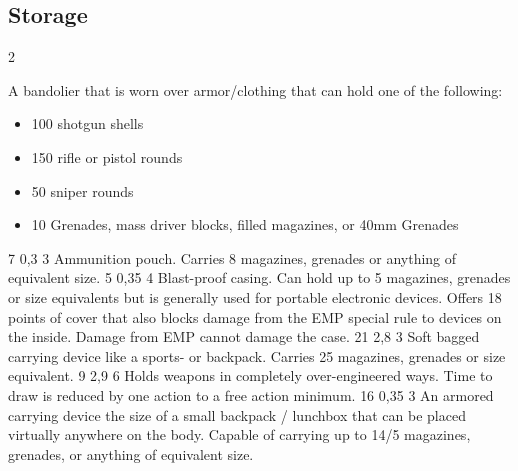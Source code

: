 
\subsection{Storage}
\vspace{10mm}
\begin{multicols}{2}
    {A bandolier that is worn over armor/clothing that can hold one of the following:
        \begin{itemize}
        \item 100 shotgun shells
		\item 150 rifle or pistol rounds
        \item 50 sniper rounds
        \item 10 Grenades, mass driver blocks, filled magazines, or 40mm Grenades
    	\end{itemize}
	}
    {7}
    {0,3}
    {3}
    {Ammunition pouch.
        Carries 8 magazines, grenades or anything of equivalent size.}
    {5}
    {0,35}
    {4}
    {Blast-proof casing.
        Can hold up to 5 magazines, grenades or size equivalents
        but is generally used for portable electronic devices.
        Offers 18 points of cover that also blocks damage from the EMP special rule to devices on the inside.
        Damage from EMP cannot damage the case.}
    {21}
    {2,8}
    {3}
    {Soft bagged carrying device like a sports- or backpack.
        Carries 25 magazines, grenades or size equivalent.}
    {9}
    {2,9}
    {6}
    {Holds weapons in completely over-engineered ways.
        Time to draw is reduced by one action to a free action minimum.}
    {16}
    {0,35}
    {3}
    {An armored carrying device the size of
        a small backpack / lunchbox that can be placed virtually anywhere on the body.
        Capable of carrying up to 14/5 magazines, grenades, or anything of equivalent size.\\
}
\end{multicols}
